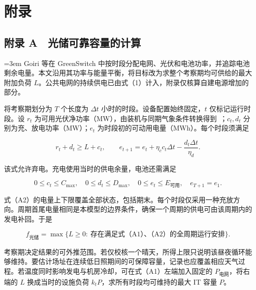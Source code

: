 
\section{附录}

\subsection{附录 A　光储可靠容量的计算}

{\sloppy\emergencystretch=3em
Goiri 等在 GreenSwitch 中按时段分配电网、光伏和电池功率，并追踪电池剩余电量\hspace{0pt}\cite[§5.2，原式（6）–（13）]{q1ref04}。本文沿用其功率与能量平衡，将目标改为求整个考察期均可供给的最大附加负荷 $L$。公共电网的持续供电已由式（1）计入，附录仅核算自建电源增加的部分。\par}

将考察期划分为 $T$ 个长度为 $\Delta t$ 小时的时段。设备配置始终固定，$t$ 仅标记运行时段。设 $r_t$ 为可用光伏净功率（MW），由装机与同期气象条件转换得到~\cite{q1ref03}；$c_t,d_t$ 分别为充、放电功率（MW）；$e_t$ 为时段初的可动用电量（MWh）。每个时段须满足

\begin{equation}
r_t+d_t\ge L+c_t,\qquad
e_{t+1}=e_t+\eta_c c_t\Delta t-\frac{d_t\Delta t}{\eta_d}.
\tag{A1}
\end{equation}

该式允许弃电。充电使用当时的供电余量，电池还需满足

\begin{equation}
0\le c_t\le C_{\max},\quad 0\le d_t\le D_{\max},\quad
0\le e_t\le E_{\text{可用}},\quad e_{T+1}=e_1 .
\tag{A2}
\end{equation}

式（A2）的电量上下限覆盖全部状态，包括期末。每个时段仅采用一种充放方向。周期首尾电量相同是本模型的边界条件，确保一个周期的供电可由该周期内的发电补回。于是

\begin{equation}
f_{\text{光储}}=\max\{L\ge0:\ \text{存在满足式（A1）、（A2）的全周期运行安排}\}.
\tag{A3}
\end{equation}

考察期决定结果的可外推范围。若仅校核一个晴天，所得上限只说明该昼夜循环能够维持。要估计场址在连续低日照期间的可保障容量，记录也应覆盖相应天气过程。若温度同时影响发电与机房冷却，可在式（A1）左端加入固定的 $P_{\text{电网}}$，将右端的 $L$ 换成当时的设施负荷 $k_tP$，求所有时段均可维持的最大 IT 容量 $P$。

